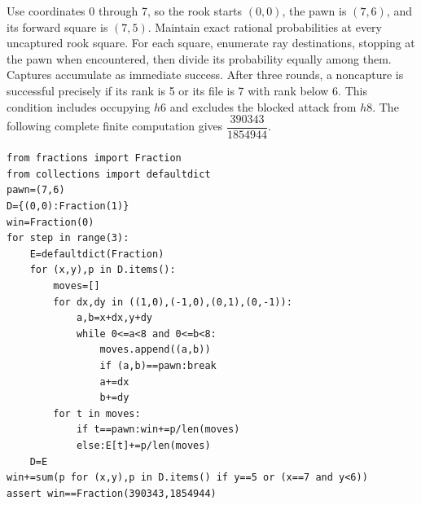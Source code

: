Use coordinates 0 through 7, so the rook starts $(0,0)$, the pawn is $(7,6)$, and its forward square is $(7,5)$. Maintain exact rational probabilities at every uncaptured rook square. For each square, enumerate ray destinations, stopping at the pawn when encountered, then divide its probability equally among them. Captures accumulate as immediate success. After three rounds, a noncapture is successful precisely if its rank is 5 or its file is 7 with rank below 6. This condition includes occupying $h6$ and excludes the blocked attack from $h8$. The following complete finite computation gives $\boxed{\dfrac{390343}{1854944}}$.
\begin{verbatim}
from fractions import Fraction
from collections import defaultdict
pawn=(7,6)
D={(0,0):Fraction(1)}
win=Fraction(0)
for step in range(3):
    E=defaultdict(Fraction)
    for (x,y),p in D.items():
        moves=[]
        for dx,dy in ((1,0),(-1,0),(0,1),(0,-1)):
            a,b=x+dx,y+dy
            while 0<=a<8 and 0<=b<8:
                moves.append((a,b))
                if (a,b)==pawn:break
                a+=dx
                b+=dy
        for t in moves:
            if t==pawn:win+=p/len(moves)
            else:E[t]+=p/len(moves)
    D=E
win+=sum(p for (x,y),p in D.items() if y==5 or (x==7 and y<6))
assert win==Fraction(390343,1854944)
\end{verbatim}
